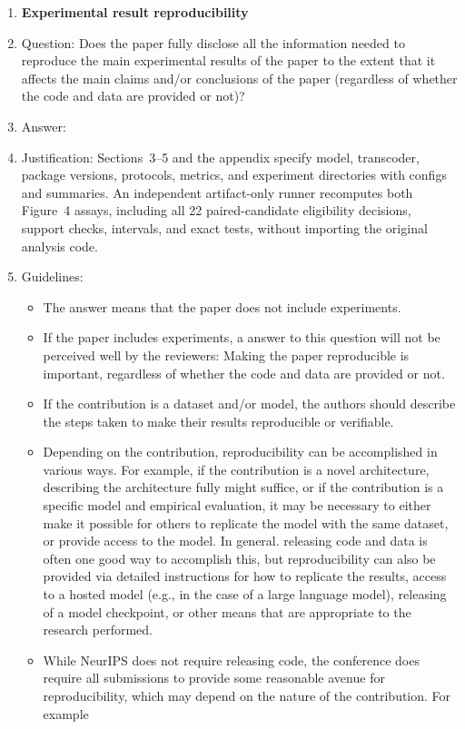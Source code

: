 \documentclass[
]{article}
\begin{document}
\begin{enumerate}
    \item {\bf Experimental result reproducibility}
    \item[] Question: Does the paper fully disclose all the information needed to reproduce the main experimental results of the paper to the extent that it affects the main claims and/or conclusions of the paper (regardless of whether the code and data are provided or not)?
    \item[] Answer: \answerYes{} %
    \item[] Justification: Sections~3--5 and the appendix specify model, transcoder, package versions, protocols, metrics, and experiment directories with configs and summaries. An independent artifact-only runner recomputes both Figure~4 assays, including all 22 paired-candidate eligibility decisions, support checks, intervals, and exact tests, without importing the original analysis code.
    \item[] Guidelines:
    \begin{itemize}
        \item The answer \answerNA{} means that the paper does not include experiments.
        \item If the paper includes experiments, a \answerNo{} answer to this question will not be perceived well by the reviewers: Making the paper reproducible is important, regardless of whether the code and data are provided or not.
        \item If the contribution is a dataset and\slash or model, the authors should describe the steps taken to make their results reproducible or verifiable. 
        \item Depending on the contribution, reproducibility can be accomplished in various ways. For example, if the contribution is a novel architecture, describing the architecture fully might suffice, or if the contribution is a specific model and empirical evaluation, it may be necessary to either make it possible for others to replicate the model with the same dataset, or provide access to the model. In general. releasing code and data is often one good way to accomplish this, but reproducibility can also be provided via detailed instructions for how to replicate the results, access to a hosted model (e.g., in the case of a large language model), releasing of a model checkpoint, or other means that are appropriate to the research performed.
        \item While NeurIPS does not require releasing code, the conference does require all submissions to provide some reasonable avenue for reproducibility, which may depend on the nature of the contribution. For example

\end{itemize}
\end{enumerate}
\end{document}

